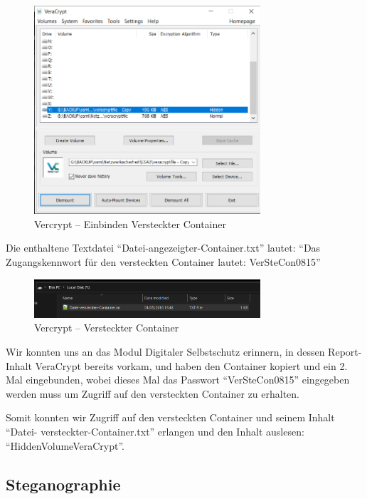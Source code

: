\documentclass{article}
\begin{document}
\begin{figure}[H]
	\includegraphics[width=0.75\textwidth]{images/12}
	\centering
	\caption{Vercrypt – Einbinden Versteckter Container}
\end{figure}

Die enthaltene Textdatei ``Datei-angezeigter-Container.txt'' lautet: ``Das 
Zugangskennwort für den versteckten Container lautet: 	VerSteCon0815''

\begin{figure}[H]
	\includegraphics[width=0.75\textwidth]{images/13}
	\centering
	\caption{Vercrypt – Versteckter Container}
\end{figure}

Wir konnten uns an das Modul Digitaler Selbstschutz erinnern, in dessen Report-
Inhalt VeraCrypt bereits vorkam, und haben den Container kopiert und ein 2. Mal 
eingebunden, wobei dieses Mal das Passwort ``VerSteCon0815'' eingegeben werden muss 
um Zugriff auf den versteckten Container zu erhalten.

Somit konnten wir Zugriff auf den versteckten Container und seinem Inhalt ``Datei-
versteckter-Container.txt'' erlangen und den Inhalt auslesen: 
``HiddenVolumeVeraCrypt''.

\newpage

\subsection{Steganographie}
\end{document}
